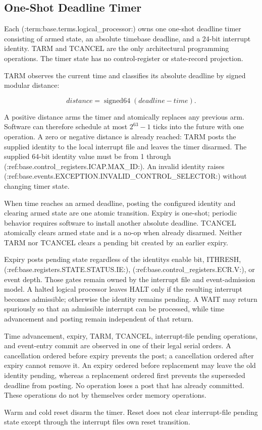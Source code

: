 \subsection{One-Shot Deadline Timer}\label{section:deadline-timer}
Each (:term:base.terms.logical_processor:) owns one one-shot deadline timer consisting of armed state, an absolute
timebase deadline, and a 24-bit interrupt identity. TARM and TCANCEL are the only architectural programming
operations. The timer state has no control-register or state-record projection.

TARM observes the current time and classifies its absolute deadline by signed modular distance:

\[
  \mathit{distance}=\operatorname{signed64}(\mathit{deadline}-\mathit{time}).
\]

A positive distance arms the timer and atomically replaces any previous arm. Software can therefore schedule at
most $2^{63}-1$ ticks into the future with one operation. A zero or negative distance is already reached: TARM posts
the supplied identity to the local interrupt file and leaves the timer disarmed. The supplied 64-bit identity value
must be from 1 through (:ref:base.control_registers.ICAP.MAX_ID:). An invalid identity raises
(:ref:base.events.EXCEPTION.INVALID_CONTROL_SELECTOR:) without changing timer state.

When time reaches an armed deadline, posting the configured identity and clearing armed state are one atomic
transition. Expiry is one-shot; periodic behavior requires software to install another absolute deadline. TCANCEL
atomically clears armed state and is a no-op when already disarmed. Neither TARM nor TCANCEL clears a pending bit
created by an earlier expiry.

Expiry posts pending state regardless of the identity\textquotesingle{}s enable bit, ITHRESH, (:ref:base.registers.STATE.STATUS.IE:), (:ref:base.control_registers.ECR.V:), or
event depth. Those gates remain owned by the interrupt file and event-admission model. A halted logical processor
leaves HALT only if the resulting interrupt becomes admissible; otherwise the identity remains pending. A WAIT may
return spuriously so that an admissible interrupt can be processed, while time advancement and posting remain
independent of that return.

Time advancement, expiry, TARM, TCANCEL, interrupt-file pending operations, and event-entry commit are observed in
one of their legal serial orders. A cancellation ordered before expiry prevents the post; a cancellation ordered
after expiry cannot remove it. An expiry ordered before replacement may leave the old identity pending, whereas a
replacement ordered first prevents the superseded deadline from posting. No operation loses a post that has already
committed. These operations do not by themselves order memory operations.

Warm and cold reset disarm the timer. Reset does not clear interrupt-file pending state except through the interrupt
file\textquotesingle{}s own reset transition.
